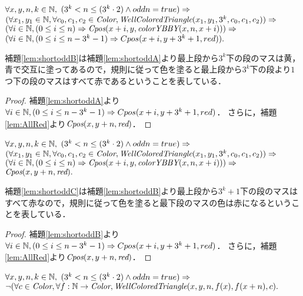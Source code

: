 \begin{lem}[\ShortOddB] \label{lem:shortoddB}
  $\forall x,y,n,k \in \mathbb{N},$
  $(3^k < n \leq (3^k\cdot2) \land odd n = true) \Rightarrow$
  $(\forall x_1,y_1 \in \mathbb{N}, \forall c_0,c_1,c_2 \in \textit{Color}, \textit{WellColoredTriangle}(x_1,y_1,3^k,c_0,c_1,c_2)) \Rightarrow$
  $(\forall i \in \mathbb{N}, (0 \leq i \leq n) \Rightarrow \textit{Cpos}(x+i,y,\textit{colorYBBY}(x,n,x+i))) \Rightarrow$
  $(\forall i \in \mathbb{N}, (0 \leq i \leq n - 3^k-1) \Rightarrow Cpos(x+i,y+3^k+1,red)).$
\end{lem}
補題\ref{lem:shortoddB}は補題\ref{lem:shortoddA}より最上段から$3^k$下の段のマスは黄，青で交互に塗ってあるので，規則に従って色を塗ると最上段から$3^k$下の段より$1$つ下の段のマスはすべて赤であるということを表している．
\begin{proof}
  補題\ref{lem:shortoddA}より$\forall i \in \mathbb{N}, (0 \leq i \leq n - 3^k-1) \Rightarrow Cpos(x+i,y+3^k+1,red)$．
  さらに，補題\ref{lem:AllRed}より$\textit{Cpos}(x,y+n,\textit{red})$．
\end{proof}

\begin{lem}[\ShortOddC] \label{lem:shortoddC}
  $\forall x,y,n,k \in \mathbb{N},$
  $(3^k < n \leq (3^k\cdot2) \land odd n = true) \Rightarrow$
  $(\forall x_1,y_1 \in \mathbb{N}, \forall c_0,c_1,c_2 \in \textit{Color}, \textit{WellColoredTriangle}(x_1,y_1,3^k,c_0,c_1,c_2)) \Rightarrow$
  $(\forall i \in \mathbb{N}, (0 \leq i \leq n) \Rightarrow \textit{Cpos}(x+i,y,\textit{colorYBBY}(x,n,x+i))) \Rightarrow$
  $\textit{Cpos}(x,y+n,\textit{red}).$
\end{lem}
補題\ref{lem:shortoddC}は補題\ref{lem:shortoddB}より最上段から$3^k+1$下の段のマスはすべて赤なので，規則に従って色を塗ると最下段のマスの色は赤になるということを表している．
\begin{proof}
  補題\ref{lem:shortoddB}より$\forall i \in \mathbb{N}, (0 \leq i \leq n - 3^k-1) \Rightarrow Cpos(x+i,y+3^k+1,red)$．
  さらに，補題\ref{lem:AllRed}より$\textit{Cpos}(x,y+n,\textit{red})$．
\end{proof}

\begin{lem}[\ShortOdd] \label{lem:shortodd}
  $\forall x,y,n,k \in \mathbb{N},$
  $(3^k < n \leq (3^k\cdot2) \land odd n = true) \Rightarrow$
  $\lnot(\forall c \in \textit{Color}, \forall f:\mathbb{N} \to \textit{Color}, \textit{WellColoredTriangle}(x,y,n,f(x),f(x+n), c).$
\end{lem}


